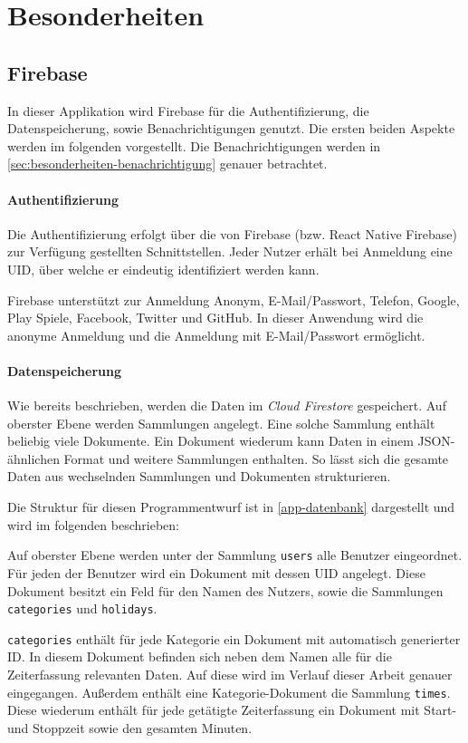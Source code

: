 \section{Besonderheiten}
\subsection{Firebase}
In dieser Applikation wird Firebase für die Authentifizierung,
die Datenspeicherung, sowie Benachrichtigungen genutzt.
Die ersten beiden Aspekte werden im folgenden vorgestellt.
Die Benachrichtigungen werden in \autoref{sec:besonderheiten-benachrichtigung} genauer betrachtet.

\paragraph{Authentifizierung}
Die Authentifizierung erfolgt über die von Firebase (bzw. React Native Firebase) zur Verfügung gestellten Schnittstellen.
Jeder Nutzer erhält bei Anmeldung eine UID, über welche er eindeutig identifiziert werden kann.

Firebase unterstützt zur Anmeldung Anonym, E-Mail/Passwort, Telefon, Google, Play Spiele, Facebook, Twitter und GitHub.
In dieser Anwendung wird die anonyme Anmeldung und die Anmeldung mit E-Mail/Passwort ermöglicht.

\paragraph{Datenspeicherung}
Wie bereits beschrieben, werden die Daten im \textit{Cloud Firestore} gespeichert.
Auf oberster Ebene werden Sammlungen angelegt.
Eine solche Sammlung enthält beliebig viele Dokumente.
Ein Dokument wiederum kann Daten in einem JSON-ähnlichen Format und weitere Sammlungen enthalten.
So lässt sich die gesamte Daten aus wechselnden Sammlungen und Dokumenten strukturieren.

Die Struktur für diesen Programmentwurf ist in \autoref{app-datenbank} dargestellt und wird im folgenden beschrieben:

Auf oberster Ebene werden unter der Sammlung \texttt{users} alle Benutzer eingeordnet.
Für jeden der Benutzer wird ein Dokument mit dessen UID angelegt.
Diese Dokument besitzt ein Feld für den Namen des Nutzers,
sowie die Sammlungen \texttt{categories} und \texttt{holidays}.

\texttt{categories} enthält für jede Kategorie ein Dokument mit automatisch generierter ID.
In diesem Dokument befinden sich neben dem Namen alle für die Zeiterfassung relevanten Daten.
Auf diese wird im Verlauf dieser Arbeit genauer eingegangen.
Außerdem enthält eine Kategorie-Dokument die Sammlung \texttt{times}.
Diese wiederum enthält für jede getätigte Zeiterfassung ein Dokument mit Start- und Stoppzeit sowie den gesamten Minuten.

